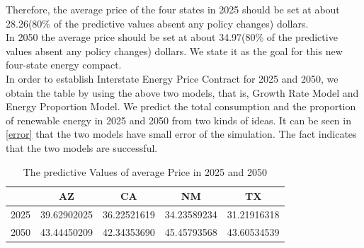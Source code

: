 Therefore, the average price of the four states in 2025 should be set at about 28.26(80\% of the predictive values absent any policy changes) dollars.\\
In 2050 the average price should be set at about 34.97(80\% of the predictive values absent any policy changes) dollars. We state it as the goal for this new four-state energy compact.\\ In order to establish Interstate Energy Price Contract for 2025 and 2050, we obtain the table by using the above two models, that is, Growth Rate Model and Energy Proportion Model. We predict the total consumption and the proportion of renewable energy in 2025 and 2050 from two kinds of ideas. It can be seen in \autoref{error} that the two models have small error of the simulation. The fact indicates that the two models are successful.\\
\begin{table}[h]
	\centering
	\caption{The predictive Values of average Price in 2025 and 2050}
	\label{predic}
	\begin{tabular}{|c|c|c|c|c|}
		\hline
		& AZ          & CA          & NM          & TX          \\ \hline
		2025 & 39.62902025 & 36.22521619 & 34.23589234 & 31.21916318 \\ \hline
		2050 & 43.44450209 & 42.34353690 & 45.45793568 & 43.60534539 \\ \hline
	\end{tabular}
\end{table}
